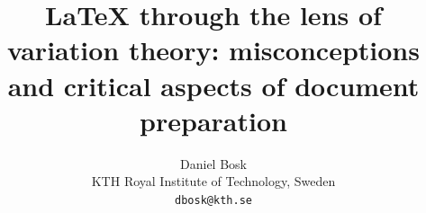 \documentclass[a4paper,10pt,article,oneside,oldfontcommands]{memoir}
\title{%
  LaTeX through the lens of variation theory:
  misconceptions and critical aspects of document preparation%
}
\author{%
  Daniel Bosk
  \\KTH Royal Institute of Technology, Sweden
  \\\texttt{dbosk@kth.se}
}
\begin{document}
\maketitle
\begin{abstract}
  
\end{abstract}

\clearpage
\tableofcontents
\clearpage













\printbibliography

\appendix



\end{document}
